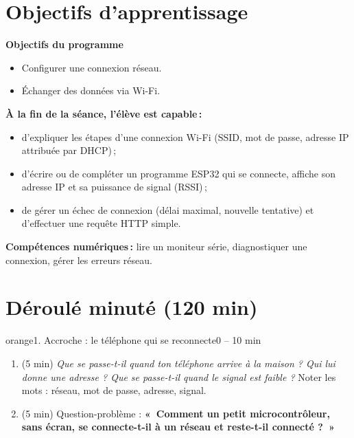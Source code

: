 \documentclass[11pt,a4paper]{article}
\begin{document}
\section{Objectifs d'apprentissage}
\begin{tcolorbox}[colback=gray!8,colframe=gray!60!black,arc=1mm,boxrule=0.5pt]
\textbf{Objectifs du programme}
\begin{itemize}
 \item Configurer une connexion réseau.
 \item Échanger des données via Wi-Fi.
\end{itemize}
\textbf{À la fin de la séance, l'élève est capable\,:}
\begin{itemize}
 \item d'expliquer les étapes d'une connexion Wi-Fi (SSID, mot de passe, adresse IP attribuée par DHCP)\,;
 \item d'écrire ou de compléter un programme ESP32 qui se connecte, affiche son adresse IP et sa puissance de signal (RSSI)\,;
 \item de gérer un échec de connexion (délai maximal, nouvelle tentative) et d'effectuer une requête HTTP simple.
\end{itemize}
\textbf{Compétences numériques\,:} lire un moniteur série, diagnostiquer une connexion, gérer les erreurs réseau.
\end{tcolorbox}

\section{Déroulé minuté (120 min)}

\begin{etape}{orange}{1. Accroche : le téléphone qui se reconnecte}{0 -- 10 min}
\begin{enumerate}
 \item (5 min) \emph{Que se passe-t-il quand ton téléphone arrive à la maison ? Qui lui donne une adresse ? Que se passe-t-il quand le signal est faible ?} Noter les mots : réseau, mot de passe, adresse, signal.
 \item (5 min) Question-problème : \textbf{«~Comment un petit microcontrôleur, sans écran, se connecte-t-il à un réseau et reste-t-il connecté ?~»}
\end{enumerate}
\end{etape}
\end{document}

